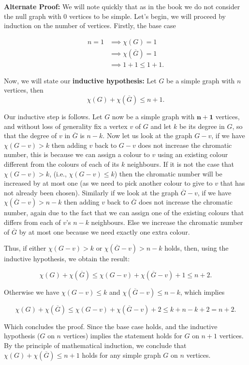\documentclass[10pt,landscape]{article}
\renewcommand{\leq}{\leqslant}
\begin{document}
\begin{multicols}{2}
\bigskip

\textbf{Alternate Proof:}
We will note quickly that as in the book we do not consider the null graph with 0 vertices to be simple. Let's begin, we will proceed by induction on the number of vertices. Firstly, the base case

\begin{align*}
n=1 &\implies \chi(G)=1\\
&\implies \chi(\overline{G})=1\\
&\implies 1 + 1\le 1+1.
\end{align*}



Now, we will state our \textbf{inductive hypothesis:} Let $G$ be a simple graph with $n$ vertices, then $$\chi(G)+\chi(\overline{G})\le n+1.$$

Our inductive step is follows. Let $G$ now be a simple graph with $\pmb{n+1}$ vertices, and without loss of generality fix a vertex $v$ of $G$ and let $k$ be its degree in $G$, so that the degree of $v$ in $\overline{G}$ is $n-k$. Now let us look at the graph $G-v$, if we have $\chi(G-v)>k$ then adding $v$ back to $G-v$ does not increase the chromatic number, this is because we can assign a colour to $v$ using an existing colour different from the colours of each of its $k$ neighbours. If it is not the case that $\chi(G-v)>k$, (i.e., $\chi(G-v)\leq k$)  then the chromatic number will be increased by at most one (as we need to pick another colour to give to $v$ that has not already been chosen). Similarly if we look at the graph $\overline{G}-v$, if we have $\chi(\overline{G}-v)>n-k$ then adding $v$ back to $\overline{G}$ does not increase the chromatic number, again due to the fact that we can assign one of the existing colours that differs from each of $v$'s $n-k$ neighbours. Else we increase the chromatic number of $\overline{G}$ by at most one because we need exactly one extra colour. 

Thus, if either $\chi(G-v)>k$ or $\chi(\overline{G}-v)>n-k$ holds, then, using the inductive hypothesis, we obtain the result:

$$\chi(G)+\chi(\overline{G}) \le \chi(G-v) + \chi(\overline{G}-v)+1 \le n+2.$$

Otherwise we have $\chi(G-v)\leq k$ and $\chi(\overline{G}-v)\le n-k$, which implies 

$$\chi(G)+\chi(\overline{G}) \le \chi(G-v) + \chi(\overline{G}-v)+2 \le k+n-k+2 = n+2.$$

Which concludes the proof. Since the base case holds, and the inductive hypothesis ($G$ on $n$ vertices) implies the statement holds for $G$ on $n+1$ vertices. By the principle of mathematical induction, we conclude that $\chi(G) +\chi(\overline{G})\leq n+1$ holds for any simple graph $G$ on $n$ vertices. 
  

\end{multicols}
\scriptsize
\end{document}
